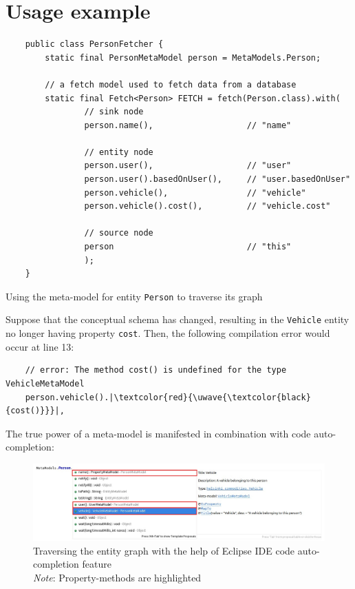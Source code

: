 \section{Usage example}
\begin{listing}[H]
    \begin{verbatim}
    public class PersonFetcher {
        static final PersonMetaModel person = MetaModels.Person;
            
        // a fetch model used to fetch data from a database
        static final Fetch<Person> FETCH = fetch(Person.class).with(
                // sink node
                person.name(),                   // "name"

                // entity node
                person.user(),                   // "user"
                person.user().basedOnUser(),     // "user.basedOnUser"
                person.vehicle(),                // "vehicle"
                person.vehicle().cost(),         // "vehicle.cost"

                // source node
                person                           // "this"
                );
    }
    \end{verbatim}
    \caption{Using the meta-model for entity \texttt{Person} to traverse its graph}
    \label{lst:person_meta-model_usage}
\end{listing}

Suppose that the conceptual schema has changed, resulting in the \texttt{Vehicle} entity no longer having property \texttt{cost}. Then, the following compilation error would occur at line 13:
\begin{verbatim}
    // error: The method cost() is undefined for the type VehicleMetaModel
    person.vehicle().|\textcolor{red}{\uwave{\textcolor{black}{cost()}}}|,
\end{verbatim}

\n

The true power of a meta-model is manifested in combination with code auto-completion:

\begin{figure}[H]\centering
    \includegraphics[scale=0.5]{images/eclipse-hl.jpg}
    \caption[Traversing the entity graph with the help of Eclipse IDE code auto-completion feature]{Traversing the entity graph with the help of Eclipse IDE code auto-completion feature
    \\
    \textit{Note}: Property-methods are highlighted}\label{fig:eclipse}
\end{figure}


